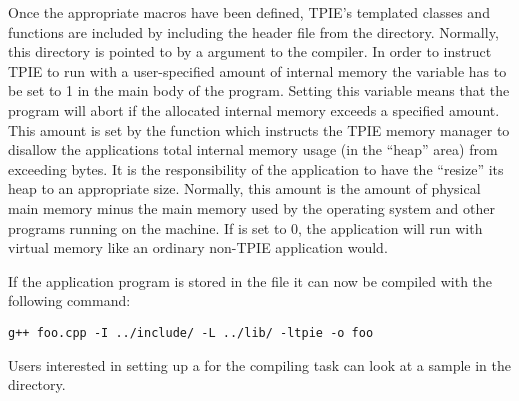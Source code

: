 Once the appropriate macros have been defined, TPIE's templated classes and
functions are included by including the header file  from the
 directory. Normally, this directory is pointed to by a
 argument to the compiler. In order to instruct TPIE to run with a
user-specified amount of internal memory the variable 
has to be set to 1 in the main body of the program. Setting this variable
means that the program will abort if the allocated internal memory exceeds
a specified amount.
This amount is set by the function 
which instructs the TPIE memory manager  to disallow the
applications total internal memory usage (in the ``heap'' area) from
exceeding  bytes. It is the responsibility of the
application to have the  ``resize'' its heap to an
appropriate size. Normally, this amount is the amount of physical main
memory minus the main memory used by the operating system and other
programs running on the machine. If  is set to 0, the
application will run with virtual memory like an ordinary non-TPIE
application would.

If the application program is stored in the file  it can now be
compiled with the following command:

\begin{verbatim}
g++ foo.cpp -I ../include/ -L ../lib/ -ltpie -o foo
\end{verbatim}

Users interested in setting up a  for the compiling task can
look at a sample  in the  directory.



